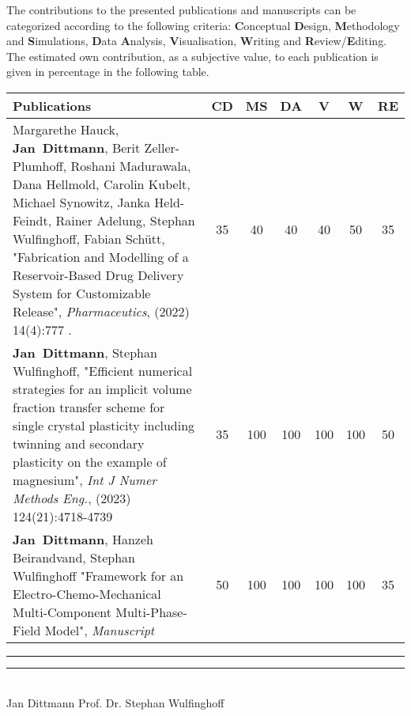 The contributions to the presented publications and manuscripts can be categorized according to the following criteria: \textbf{C}onceptual \textbf{D}esign, \textbf{M}ethodology and \textbf{S}imulations, \textbf{D}ata \textbf{A}nalysis, \textbf{V}isualisation, \textbf{W}riting and \textbf{R}eview/\textbf{E}diting. The estimated own contribution, as a subjective value, to each publication is given in percentage in the following table.


	\begin{xltabular}{\textwidth}{| L | c | c | c | c | c | c |}
	\hline    
		\textbf{Publications} & \textbf{CD} & \textbf{MS} & \textbf{DA} & \textbf{V} & \textbf{W} & \textbf{RE}\tabularnewline 
		\hline    
Margarethe Hauck, \mbox{\textbf{Jan Dittmann}}, Berit Zeller-Plumhoff, Roshani Madurawala, Dana Hellmold,  Carolin Kubelt, Michael Synowitz, Janka Held-Feindt, Rainer Adelung, Stephan Wulfinghoff, Fabian Schütt, "Fabrication and Modelling of a Reservoir-Based Drug Delivery System for Customizable Release", \textit{Pharmaceutics}, (2022) 14(4):777 .&35&40&40&40&50&35\tabularnewline \hline
\mbox{\textbf{Jan Dittmann}}, Stephan Wulfinghoff, "Efficient numerical strategies for an implicit volume fraction transfer scheme for single crystal plasticity including twinning and secondary plasticity on the example of magnesium", \textit{Int J Numer Methods Eng.}, (2023) 124(21):4718-4739 & 35 & 100 & 100 & 100 & 100 & 50 \\ \hline
\mbox{\textbf{Jan Dittmann}}, Hanzeh Beirandvand, Stephan Wulfinghoff "Framework for an Electro-Chemo-Mechanical Multi-Component Multi-Phase-Field Model", \textit{Manuscript} & 50 & 100 & 100 & 100 & 100 & 35 \\ \hline
\end{xltabular} 
\vspace{4cm}
\rule{5cm}{0.2pt} \hspace{4cm} \rule{5cm}{0.2pt}\\ 
\hspace*{1cm} Jan Dittmann \hspace{5.2cm} Prof. Dr. Stephan Wulfinghoff

